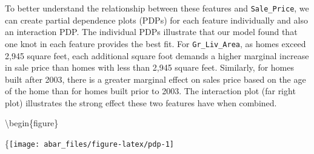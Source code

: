 \documentclass[]{book}
\newenvironment{Shaded}{\begin{snugshade}}{\end{snugshade}}
\newcommand{\DataTypeTok}[1]{\textcolor[rgb]{0.13,0.29,0.53}{#1}}
\newcommand{\DecValTok}[1]{\textcolor[rgb]{0.00,0.00,0.81}{#1}}
\newcommand{\KeywordTok}[1]{\textcolor[rgb]{0.13,0.29,0.53}{\textbf{#1}}}
\newcommand{\NormalTok}[1]{#1}
\newcommand{\OperatorTok}[1]{\textcolor[rgb]{0.81,0.36,0.00}{\textbf{#1}}}
\newcommand{\OtherTok}[1]{\textcolor[rgb]{0.56,0.35,0.01}{#1}}
\newcommand{\StringTok}[1]{\textcolor[rgb]{0.31,0.60,0.02}{#1}}
\theoremstyle{definition}
\theoremstyle{definition}
\theoremstyle{definition}
\theoremstyle{remark}
\begin{document}
To better understand the relationship between these features and
\texttt{Sale\_Price}, we can create partial dependence plots (PDPs) for
each feature individually and also an interaction PDP. The individual
PDPs illustrate that our model found that one knot in each feature
provides the best fit. For \texttt{Gr\_Liv\_Area}, as homes exceed 2,945
square feet, each additional square foot demands a higher marginal
increase in sale price than homes with less than 2,945 square feet.
Similarly, for homes built after 2003, there is a greater marginal
effect on sales price based on the age of the home than for homes built
prior to 2003. The interaction plot (far right plot) illustrates the
strong effect these two features have when combined.

\begin{Shaded}
\end{Shaded}

\textbackslash{}begin\{figure\}

\{\centering \texttt{[image: abar\_files/figure-latex/pdp-1]}
\end{document}

